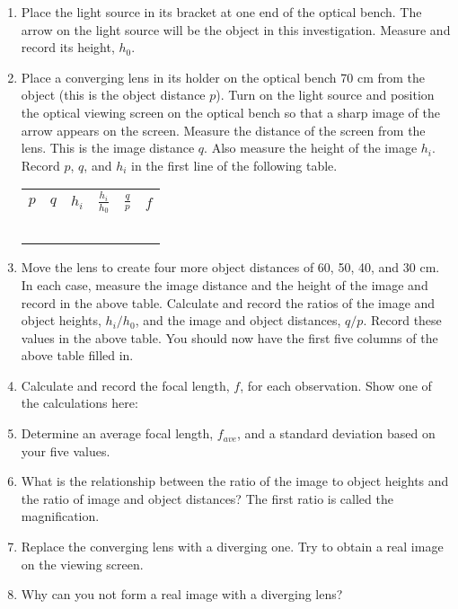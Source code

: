 \begin{enumerate}[labparts]
\item Place the light source in its bracket at one end of the optical bench. 
The arrow on the light source will be the object in this investigation. Measure
and record its height, $h_0$.\vspace{10mm}

\item Place a converging lens in its holder on the optical bench 70 cm from the object (this is the object distance $p$). Turn on the light source and position the optical viewing screen on the optical bench so that a sharp image of the arrow appears on the screen. Measure the distance of the screen from the lens. This is the image distance $q$. Also measure the height of the image $h_i$. Record $p$, $q$, and $h_i$ in the first line of the following table.
\vspace{0.3cm}

\begin{center}
{\renewcommand{\arraystretch}{1.5}
\begin{tabular}{*{6}{|C{0.7in}}|}
\hline
$p$ & 
$q$ & 
$h_i$ & 
$\frac{h_i}{h_0}$ &
$\frac{q}{p}$ &
$f$ \\
\hhline{|=|=|=|=|=|=|}
& & & & &\\
\hline 
& & & & &\\
\hline 
& & & & &\\
\hline 
& & & & &\\
\hline 
& & & & &\\
\hline 
\end{tabular}
}
\end{center}
\vspace{0.3cm}

\item Move the lens to create four more object distances of 60, 50, 40, and 30 cm. In each case, measure the image distance and the height of the image and record in the above table. Calculate and record the ratios of the image and object heights, $h_i / h_0$, and the image and object distances, $q / p$. Record these values in the above table. You should now have the first five columns of the above table filled in.
\item Calculate and record the focal length, $f$, for each observation. Show one of the calculations here:\vspace{15mm}
\item Determine an average focal length, $f_{ave}$, and a standard
deviation based on your five values.\vspace{15mm}
\item What is the relationship between the ratio of the image to object
heights and the ratio of image and object distances? The first ratio
is called the magnification.\vspace{15mm}

\item Replace the converging lens with a diverging one. Try to obtain a
real image on the viewing screen.
\item Why can you not form a real image with a diverging lens?\vspace{15mm}

\end{enumerate}
